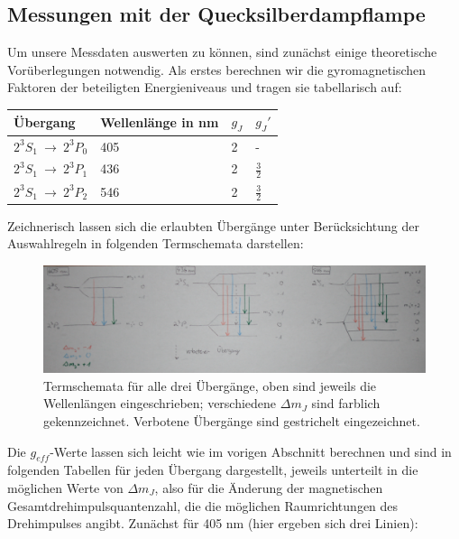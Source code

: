 \documentclass[bigchapter,colorback,accentcolor=tud4b,linedtoc,11pt]{tudreport}
\begin{document}
\subsection{Messungen mit der Quecksilberdampflampe}

Um unsere Messdaten auswerten zu können, sind zunächst einige theoretische Vorüberlegungen notwendig. Als erstes berechnen wir die gyromagnetischen Faktoren der beteiligten Energieniveaus und tragen sie tabellarisch auf: 

\begin{center}
  \begin{tabular}{|p{2.2cm}|p{4cm}|p{2cm}|p{2cm}|}
    \hline
    Übergang                    & Wellenlänge in nm & $g_J$ & $g_J'$        \\ \hline
    $2^3S_1~\rightarrow~2^3P_0$ & 405               & 2     & -             \\ \hline
    $2^3S_1~\rightarrow~2^3P_1$ & 436               & 2     & $\frac{3}{2}$ \\ \hline
    $2^3S_1~\rightarrow~2^3P_2$ & 546               & 2     & $\frac{3}{2}$ \\ \hline
	\end{tabular}
\end{center}

Zeichnerisch lassen sich die erlaubten Übergänge unter Berücksichtung der Auswahlregeln in folgenden Termschemata darstellen:

\begin{figure}[H] 
  \centering
     \includegraphics[width=1\textwidth]{data/Termschemata.JPG}
  \caption{Termschemata für alle drei Übergänge, oben sind jeweils die Wellenlängen eingeschrieben; verschiedene $\Delta m_J$ sind farblich gekennzeichnet. Verbotene Übergänge sind gestrichelt eingezeichnet.}
  \label{fig:Bild3}
\end{figure}

Die $g_{eff}$-Werte lassen sich leicht wie im vorigen Abschnitt berechnen und sind in folgenden Tabellen für jeden Übergang dargestellt, jeweils unterteilt in die möglichen Werte von $\Delta m_J$, also für die Änderung der magnetischen Gesamtdrehimpulsquantenzahl, die die möglichen Raumrichtungen des Drehimpulses angibt. Zunächst für 405 nm (hier ergeben sich drei Linien):
\end{document}
